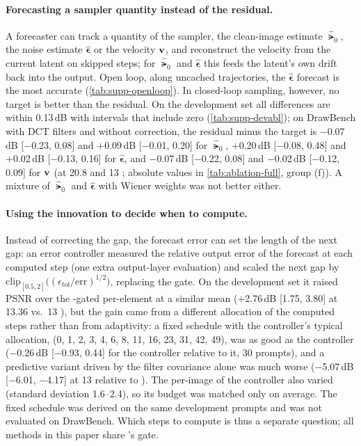 \paragraph{Forecasting a sampler quantity instead of the residual.}
A forecaster can track a quantity of the sampler, the clean-image estimate $\hat\lat_0$, the noise estimate
$\hat{\boldsymbol\epsilon}$ or the velocity $\mathbf{v}$, and reconstruct the velocity from the current latent on skipped
steps; for $\hat\lat_0$ and $\hat{\boldsymbol\epsilon}$ this feeds the latent's own drift back into the output. Open
loop, along uncached trajectories, the $\hat{\boldsymbol\epsilon}$ forecast is the most accurate
(\cref{tab:supp-openloop}). In closed-loop sampling, however, no target is better than the residual. On the development
set all differences are within 0.13\,dB with intervals that include zero (\cref{tab:supp-devabl}); on DrawBench with
DCT filters and without correction, the residual minus the target is $-$0.07\,dB [$-$0.23, 0.08] and $+$0.09\,dB
[$-$0.01, 0.20] for $\hat\lat_0$, $+$0.20\,dB [$-$0.08, 0.48] and $+$0.02\,dB [$-$0.13, 0.16] for
$\hat{\boldsymbol\epsilon}$, and $-$0.07\,dB [$-$0.22, 0.08] and $-$0.02\,dB [$-$0.12, 0.09] for $\mathbf{v}$ (at 20.8 and
13 \nfe; absolute values in \cref{tab:ablation-full}, group (f)). A mixture of $\hat\lat_0$ and
$\hat{\boldsymbol\epsilon}$ with Wiener weights was not better either.

\paragraph{Using the innovation to decide when to compute.}
Instead of correcting the gap, the forecast error can set the length of the next gap: an error controller measured the
relative output error of the forecast at each computed step (one extra output-layer evaluation) and scaled the next gap
by $\mathrm{clip}_{[0.5,2]}\big((\epsilon_{\mathrm{tol}}/\mathrm{err})^{1/2}\big)$, replacing the \sea gate. On the
development set it raised PSNR over the \sea-gated per-element \kalsea at a similar mean \nfe ($+$2.76\,dB [1.75, 3.80]
at 13.36 vs.\ 13 \nfe), but the gain came from a different allocation of the computed steps rather than from adaptivity:
a fixed schedule with the controller's typical allocation, (0, 1, 2, 3, 4, 6, 8, 11, 16, 23, 31, 42, 49), was as good
as the controller ($-$0.26\,dB [$-$0.93, 0.44] for the controller relative to it, 30 prompts), and a predictive variant
driven by the filter covariance alone was much worse ($-$5.07\,dB [$-$6.01, $-$4.17] at 13 \nfe relative to \kalsea).
The per-image \nfe of the controller also varied (standard deviation 1.6--2.4), so its budget was matched only on
average. The fixed schedule was derived on the same development prompts and was not evaluated on DrawBench. Which steps
to compute is thus a separate question; all methods in this paper share \seacache's gate.

